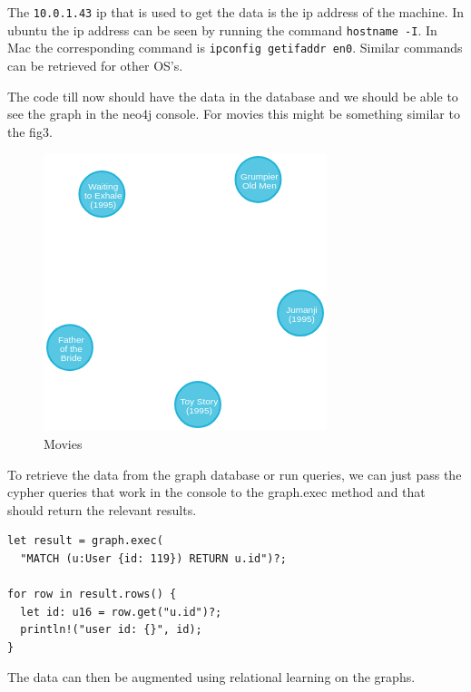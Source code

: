 \documentclass{book}
\begin{document}
The \lstinline{10.0.1.43} ip that is used to get the data is the ip address of the machine. In ubuntu the ip address can be seen by running the command \lstinline{hostname -I}. In Mac the corresponding command is \lstinline{ipconfig getifaddr en0}. Similar commands can be retrieved for other OS's.

The code till now should have the data in the database and we should be able to see the graph in the neo4j console. For movies this might be something similar to the fig3.

\begin{figure}[htpb]
	\centering
	\includegraphics[scale=0.5]{graph.png}
	\caption{Movies}
	\label{fig:graph}
\end{figure}

To retrieve the data from the graph database or run queries, we can just pass the cypher queries that work in the console to the graph.exec method and that should return the relevant results.

\begin{lstlisting}[caption={chapter4\\/working\_with\_data\\/graph\_db\\/src\\/main\\.toml},basicstyle=\small]
let result = graph.exec(
  "MATCH (u:User {id: 119}) RETURN u.id")?;

for row in result.rows() {
  let id: u16 = row.get("u.id")?;
  println!("user id: {}", id);
}
\end{lstlisting}

The data can then be augmented using relational learning on the graphs\cite{2015arXiv150300759N}.

\label{sec:nosql}
\end{document}
